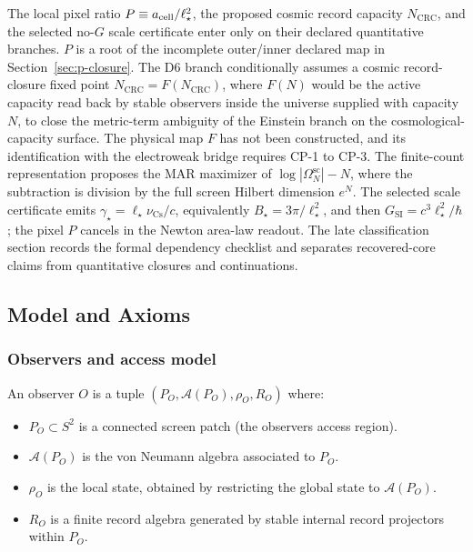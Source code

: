 The local pixel ratio \(P \equiv a_{\rm cell}/\ell_\star^2\), the proposed cosmic record capacity
\(N_{\mathrm{CRC}}\), and the selected no-\(G\) scale certificate enter only on
their declared quantitative branches. \(P\) is a root of the incomplete outer/inner declared map in
Section~\ref{sec:p-closure}. The D6 branch conditionally assumes a cosmic
record-closure fixed point \(N_{\mathrm{CRC}}=F(N_{\mathrm{CRC}})\), where \(F(N)\) would be the active
capacity read back by stable observers inside the universe supplied with capacity \(N\), to close the
metric-term ambiguity of the Einstein branch on the cosmological-capacity surface. The physical
map \(F\) has not been constructed, and its identification with the electroweak bridge requires
CP-1 to CP-3. The finite-count
representation proposes the MAR maximizer of \(\log|\Omega^{\mathrm{sc}}_N|-N\), where the subtraction
is division by the full screen Hilbert dimension \(e^N\). The selected scale certificate emits
\(\gamma_\star=\ell_\star\nu_{\mathrm{Cs}}/c\), equivalently
\(B_\star=3\pi/\ell_\star^2\), and then \(G_{\mathrm{SI}}=c^3\ell_\star^2/\hbar\); the pixel \(P\)
cancels in the Newton area-law readout. The late classification section records the formal dependency checklist and separates
recovered-core claims from quantitative closures and continuations.

\subsection{Model and Axioms}\label{1-model-and-axioms}

\subsubsection{Observers and access model}\label{11-observers-and-access-model}

An observer \(O\) is a tuple \((P_O, \mathcal{A}(P_O), \rho_O, R_O)\) where:

\begin{itemize}
\tightlist
\item
  \(P_O \subset S^2\) is a connected screen patch (the observer\textquotesingle s access region).
\item
  \(\mathcal{A}(P_O)\) is the von Neumann algebra associated to \(P_O\).
\item
  \(\rho_O\) is the local state, obtained by restricting the global state to \(\mathcal{A}(P_O)\).
\item
  \(R_O\) is a finite record algebra generated by stable internal record projectors within \(P_O\).
\end{itemize}

